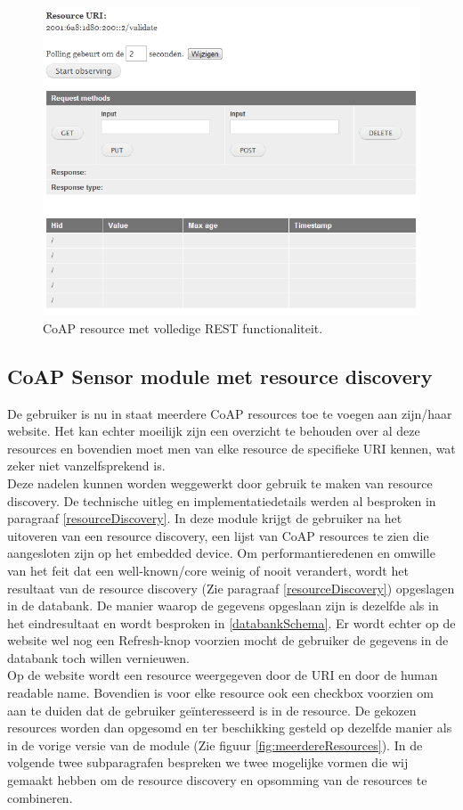 \begin{figure}[h!]
\centering
\includegraphics[width=1\textwidth]{fig/rest}
\caption{CoAP resource met volledige REST functionaliteit.}
\label{fig:rest}
\end{figure}

\subsection{CoAP Sensor module met resource discovery}
De gebruiker is nu in staat meerdere CoAP resources toe te voegen aan zijn/haar website. Het kan echter moeilijk zijn een overzicht te behouden over al deze resources en bovendien moet men van elke resource de specifieke URI kennen, wat zeker niet vanzelfsprekend is.\\

Deze nadelen kunnen worden weggewerkt door gebruik te maken van resource discovery. De technische uitleg en implementatiedetails werden al besproken in paragraaf \ref{resourceDiscovery}. In deze module krijgt de gebruiker na het uitoveren van een resource discovery, een lijst van CoAP resources te zien die aangesloten zijn op het embedded device. Om performantieredenen en omwille van het feit dat een well-known/core weinig of nooit verandert, wordt het resultaat van de resource discovery (Zie paragraaf \ref{resourceDiscovery}) opgeslagen in de databank. De manier waarop de gegevens opgeslaan zijn is dezelfde als in het eindresultaat en wordt besproken in \ref{databankSchema}. Er wordt echter op de website wel nog een Refresh-knop voorzien mocht de gebruiker de gegevens in de databank toch willen vernieuwen.\\
Op de website wordt een resource weergegeven door de URI en door de human readable name. Bovendien is voor elke resource ook een checkbox voorzien om aan te duiden dat de gebruiker ge\"{i}nteresseerd is in de resource. De gekozen resources worden dan opgesomd en ter beschikking gesteld op dezelfde manier als in de vorige versie van de module (Zie figuur \ref{fig:meerdereResources}). In de volgende twee subparagrafen bespreken we twee mogelijke vormen die wij gemaakt hebben om de resource discovery en opsomming van de resources te combineren.

